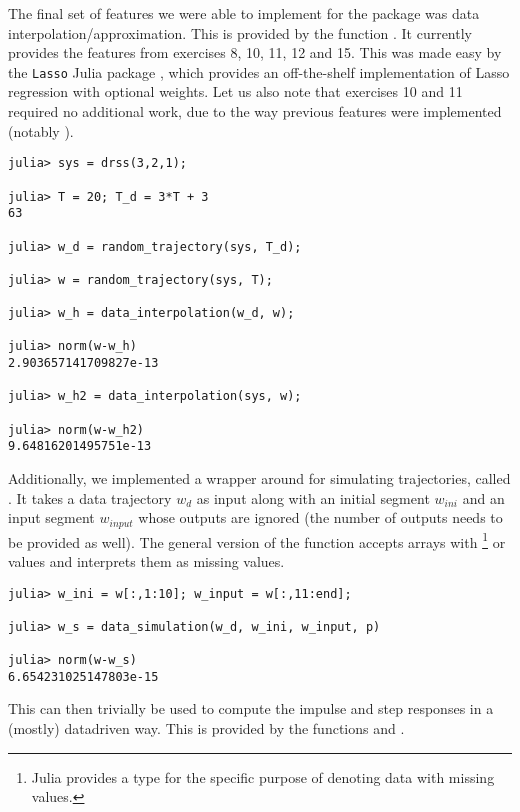 \documentclass[11pt]{article}
\begin{document}
The final set of features we were able to implement for the package was data interpolation/approximation. This is provided by the function . It currently provides the features from exercises 8, 10, 11, 12 and 15. This was made easy by the \texttt{Lasso} Julia package \cite{lasso}, which provides an off-the-shelf implementation of Lasso regression with optional weights. Let us also note that exercises 10 and 11 required no additional work, due to the way previous features were implemented (notably ).

\begin{codebox}
\begin{verbatim}
julia> sys = drss(3,2,1);

julia> T = 20; T_d = 3*T + 3
63

julia> w_d = random_trajectory(sys, T_d);

julia> w = random_trajectory(sys, T);

julia> w_h = data_interpolation(w_d, w);

julia> norm(w-w_h)
2.903657141709827e-13

julia> w_h2 = data_interpolation(sys, w);

julia> norm(w-w_h2)
9.64816201495751e-13
\end{verbatim}
\end{codebox}
Additionally, we implemented a wrapper around  for simulating trajectories, called . It takes a data trajectory $w_d$ as input along with an initial segment $w_{ini}$ and an input segment $w_{input}$ whose outputs are ignored (the number of outputs needs to be provided as well). The general version of the function accepts arrays with \footnote{Julia provides a  type for the specific purpose of denoting data with missing values.} or  values and interprets them as missing values.

\begin{codebox}
\begin{verbatim}
julia> w_ini = w[:,1:10]; w_input = w[:,11:end];

julia> w_s = data_simulation(w_d, w_ini, w_input, p)

julia> norm(w-w_s)
6.654231025147803e-15
\end{verbatim}
\end{codebox}

This can then trivially be used to compute the impulse and step responses in a (mostly) datadriven way. This is provided by the functions  and .
\end{document}
